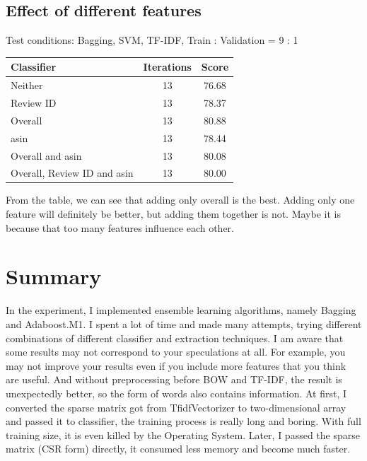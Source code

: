 \documentclass[paper=a4, fontsize=11pt, UTF8]{article} %
\begin{document}
\subsection{Effect of different features}
Test conditions: Bagging, SVM, TF-IDF, Train : Validation = 9 : 1
\begin{center}
    \begin{tabular}{l|c|c}
        \hline
        Classifier & Iterations & Score\\
        \hline
        Neither & 13 & 76.68\\
        \hline
        Review ID & 13 & 78.37\\
        \hline
        Overall & 13 & 80.88\\
        \hline
        asin & 13 & 78.44 \\
        \hline
        Overall and asin & 13 & 80.08 \\
        \hline
        Overall, Review ID and asin & 13 & 80.00\\
        \hline
    \end{tabular}
\end{center}
From the table, we can see that adding only overall is the best. Adding only one feature will definitely be better, but adding them together is not. Maybe it is because that too many features influence each other.

\section{Summary}
In the experiment, I implemented ensemble learning algorithms, namely Bagging and Adaboost.M1. I spent a lot of time and made many attempts, trying different combinations of different classifier and extraction techniques. I am aware that some results may not correspond to your speculations at all. For example, you may not improve your results even if you include more features that you think are useful. And without preprocessing before BOW and TF-IDF, the result is unexpectedly better, so the form of words also contains information. At first, I converted the sparse matrix got from TfidfVectorizer to two-dimensional array and passed it to classifier, the training process is really long and boring. With full training size, it is even killed by the Operating System. Later, I passed the sparse matrix (CSR form) directly, it consumed less memory and become much faster.
\end{document}
